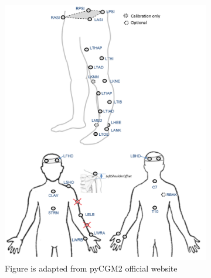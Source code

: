 \documentclass[../main.tex]{subfiles}
\begin{document}
\begin{figure}
     \centering
     \begin{subfigure}[b]{0.5\textwidth}
         \centering
         \includegraphics[width=\textwidth]{img/CGM23_markerset3.png}
         \caption{Figure is adapted from pyCGM2 official website \cite{Leboeuf2019}}
         \label{fig:cgm23-markerset-guidelines}
     \end{subfigure}
     \hfill
     \begin{subfigure}[b]{0.4\textwidth}
         \centering

\end{subfigure}
\end{figure}
\end{document}
